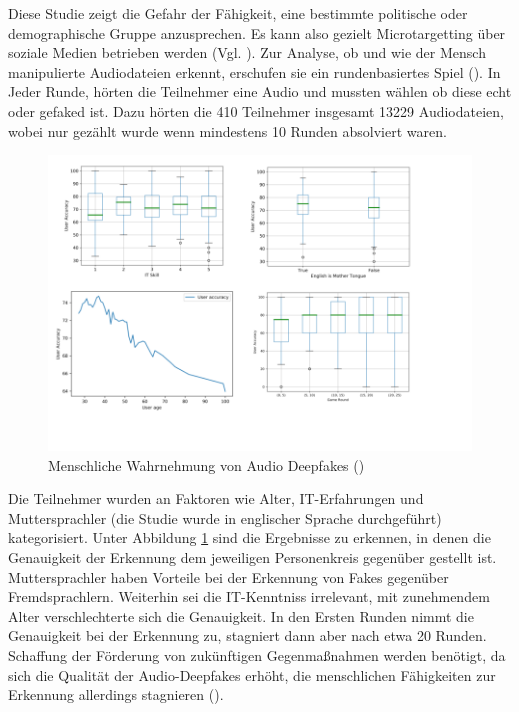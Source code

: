 Diese Studie zeigt die Gefahr der Fähigkeit, eine bestimmte politische oder demographische Gruppe anzusprechen.
Es kann also gezielt Microtargetting über soziale Medien betrieben werden (Vgl. \cite{Hancock2021}).
\newpage
Zur Analyse, ob und wie der Mensch manipulierte Audiodateien erkennt, erschufen sie ein rundenbasiertes Spiel (\cite{Mueller2022}).
In Jeder Runde, hörten die Teilnehmer eine Audio und mussten wählen ob diese echt oder gefaked ist.
Dazu hörten die 410 Teilnehmer insgesamt 13229 Audiodateien, wobei nur gezählt wurde wenn mindestens 10 Runden absolviert waren.
\par
\begin{figure}[h]
 \centering
 \includegraphics{Assets/ResultsHumanDetectionDeepFake.png}
 \caption{Menschliche Wahrnehmung von Audio Deepfakes (\cite{Mueller2022})}
 \label{fig:ResultsDetectionDeepfake}
\end{figure}
Die Teilnehmer wurden an Faktoren wie Alter, IT-Erfahrungen und Muttersprachler (die Studie wurde in englischer Sprache durchgeführt) kategorisiert.
Unter Abbildung \ref{fig:ResultsDetectionDeepfake} sind die Ergebnisse zu erkennen, in denen die Genauigkeit der Erkennung dem jeweiligen Personenkreis gegenüber gestellt ist.
Muttersprachler haben Vorteile bei der Erkennung von Fakes gegenüber Fremdsprachlern.
Weiterhin sei die IT-Kenntniss irrelevant, mit zunehmendem Alter verschlechterte sich die Genauigkeit. 
In den Ersten Runden nimmt die Genauigkeit bei der Erkennung zu, stagniert dann aber nach etwa 20 Runden.
Schaffung der Förderung von zukünftigen Gegenmaßnahmen werden benötigt, da sich die Qualität der Audio-Deepfakes erhöht, die menschlichen Fähigkeiten zur Erkennung allerdings stagnieren (\cite{Mueller2022}).
